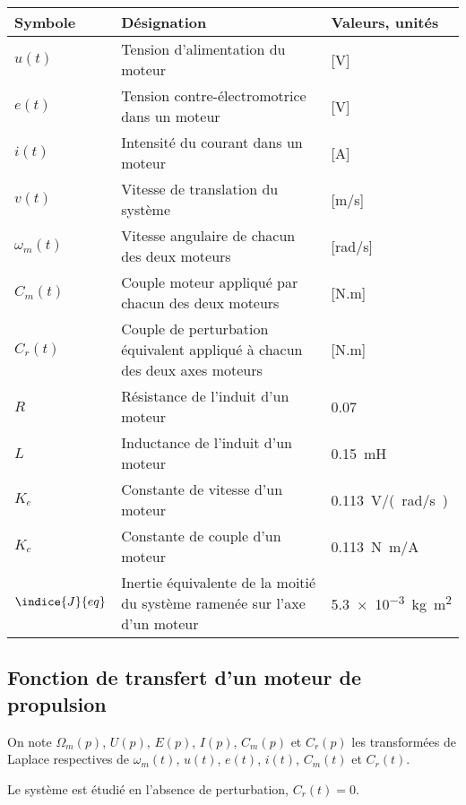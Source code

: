 \begin{table}[!ht]
\centering
\begin{tabular}{lll}
\hline
\textbf{Symbole} & \textbf{Désignation} & \textbf{Valeurs, unités} \\
\hline
$u(t)$ 		& Tension d’alimentation du moteur 		& [V] \\
$e(t)$ 		& Tension contre-électromotrice dans un moteur 	&[V] \\
$i(t)$	 	& Intensité du courant dans un moteur 		& [A] \\
$v(t)$ 		& Vitesse de translation du système 		& [m/s] \\
$\omega_m(t)$	& Vitesse angulaire de chacun des deux moteurs	& [rad/s]\\
$C_m(t)$ 	& Couple moteur appliqué par chacun des deux moteurs & [N.m]\\
$C_r(t)$	& Couple de perturbation équivalent appliqué à chacun des deux axes moteurs & [N.m] \\
$R$ 		& Résistance de l’induit d’un moteur 		& \SI{0,07}{\Omega} \\
$L$ 		& Inductance de l’induit d’un moteur 		& \SI{0,15}{mH} \\
$K_e$ 		& Constante de vitesse d’un moteur 		& \SI{0,113}{V/(rad/s)}\\
$K_c$ 		& Constante de couple d’un moteur 		& \SI{0,113}{N.m/A}\\
$\indice{J}{eq}$& Inertie équivalente de la moitié du système ramenée sur l’axe d’un moteur 
								& \SI{5,3e-3}{kg.m^2}\\\hline
\end{tabular}
\end{table}

\subsection*{Fonction de transfert d’un moteur de propulsion}

On note $\Omega_m(p)$, $U(p)$, $E(p)$, $I(p)$, $C_m(p)$ et $C_r(p)$ les transformées de Laplace respectives de $\omega_m(t)$,
$u(t)$, $e(t)$, $i(t)$, $C_m(t)$ et $C_r(t)$.



Le système est étudié en l’absence de perturbation, $C_r(t) = 0$.

